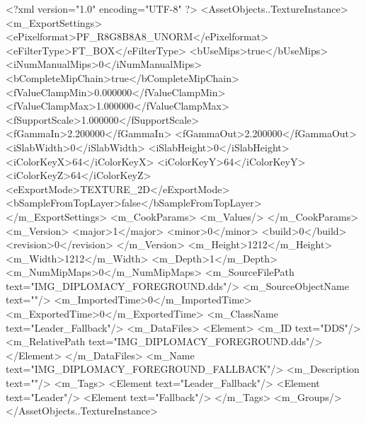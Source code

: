 <?xml version="1.0" encoding="UTF-8" ?>
<AssetObjects..TextureInstance>
	<m_ExportSettings>
		<ePixelformat>PF_R8G8B8A8_UNORM</ePixelformat>
		<eFilterType>FT_BOX</eFilterType>
		<bUseMips>true</bUseMips>
		<iNumManualMips>0</iNumManualMips>
		<bCompleteMipChain>true</bCompleteMipChain>
		<fValueClampMin>0.000000</fValueClampMin>
		<fValueClampMax>1.000000</fValueClampMax>
		<fSupportScale>1.000000</fSupportScale>
		<fGammaIn>2.200000</fGammaIn>
		<fGammaOut>2.200000</fGammaOut>
		<iSlabWidth>0</iSlabWidth>
		<iSlabHeight>0</iSlabHeight>
		<iColorKeyX>64</iColorKeyX>
		<iColorKeyY>64</iColorKeyY>
		<iColorKeyZ>64</iColorKeyZ>
		<eExportMode>TEXTURE_2D</eExportMode>
		<bSampleFromTopLayer>false</bSampleFromTopLayer>
	</m_ExportSettings>
	<m_CookParams>
		<m_Values/>
	</m_CookParams>
	<m_Version>
		<major>1</major>
		<minor>0</minor>
		<build>0</build>
		<revision>0</revision>
	</m_Version>
	<m_Height>1212</m_Height>
	<m_Width>1212</m_Width>
	<m_Depth>1</m_Depth>
	<m_NumMipMaps>0</m_NumMipMaps>
	<m_SourceFilePath text="IMG_DIPLOMACY_FOREGROUND.dds"/>
	<m_SourceObjectName text=""/>
	<m_ImportedTime>0</m_ImportedTime>
	<m_ExportedTime>0</m_ExportedTime>
	<m_ClassName text="Leader_Fallback"/>
	<m_DataFiles>
		<Element>
			<m_ID text="DDS"/>
			<m_RelativePath text="IMG_DIPLOMACY_FOREGROUND.dds"/>
		</Element>
	</m_DataFiles>
	<m_Name text="IMG_DIPLOMACY_FOREGROUND_FALLBACK"/>
	<m_Description text=""/>
	<m_Tags>
		<Element text="Leader_Fallback"/>
		<Element text="Leader"/>
		<Element text="Fallback"/>
	</m_Tags>
	<m_Groups/>
</AssetObjects..TextureInstance>
